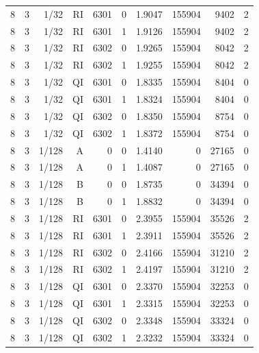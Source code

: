 \begin{longtable}{lrrrrrrrrr}
8 & 3 & 1/32 & RI & 6301 & 0 & 1.9047 & 155904 & 9402 & 2 \\
8 & 3 & 1/32 & RI & 6301 & 1 & 1.9126 & 155904 & 9402 & 2 \\
8 & 3 & 1/32 & RI & 6302 & 0 & 1.9265 & 155904 & 8042 & 2 \\
8 & 3 & 1/32 & RI & 6302 & 1 & 1.9255 & 155904 & 8042 & 2 \\
8 & 3 & 1/32 & QI & 6301 & 0 & 1.8335 & 155904 & 8404 & 0 \\
8 & 3 & 1/32 & QI & 6301 & 1 & 1.8324 & 155904 & 8404 & 0 \\
8 & 3 & 1/32 & QI & 6302 & 0 & 1.8350 & 155904 & 8754 & 0 \\
8 & 3 & 1/32 & QI & 6302 & 1 & 1.8372 & 155904 & 8754 & 0 \\
8 & 3 & 1/128 & A & 0 & 0 & 1.4140 & 0 & 27165 & 0 \\
8 & 3 & 1/128 & A & 0 & 1 & 1.4087 & 0 & 27165 & 0 \\
8 & 3 & 1/128 & B & 0 & 0 & 1.8735 & 0 & 34394 & 0 \\
8 & 3 & 1/128 & B & 0 & 1 & 1.8832 & 0 & 34394 & 0 \\
8 & 3 & 1/128 & RI & 6301 & 0 & 2.3955 & 155904 & 35526 & 2 \\
8 & 3 & 1/128 & RI & 6301 & 1 & 2.3911 & 155904 & 35526 & 2 \\
8 & 3 & 1/128 & RI & 6302 & 0 & 2.4166 & 155904 & 31210 & 2 \\
8 & 3 & 1/128 & RI & 6302 & 1 & 2.4197 & 155904 & 31210 & 2 \\
8 & 3 & 1/128 & QI & 6301 & 0 & 2.3370 & 155904 & 32253 & 0 \\
8 & 3 & 1/128 & QI & 6301 & 1 & 2.3315 & 155904 & 32253 & 0 \\
8 & 3 & 1/128 & QI & 6302 & 0 & 2.3348 & 155904 & 33324 & 0 \\
8 & 3 & 1/128 & QI & 6302 & 1 & 2.3232 & 155904 & 33324 & 0 \\
\end{longtable}
\endgroup
